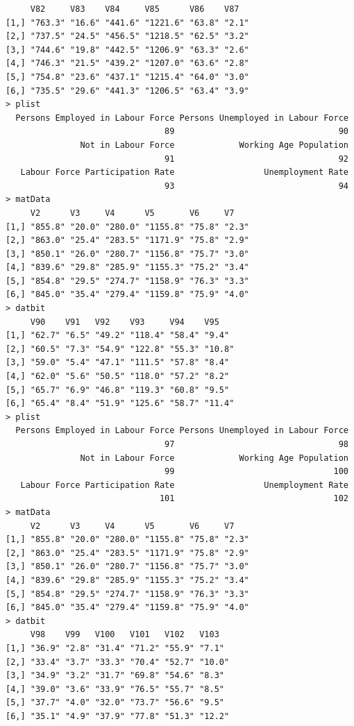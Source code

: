 \documentclass[a4paper]{article}
\begin{document}
\begin{verbatim}
     V82     V83    V84     V85      V86    V87  
[1,] "763.3" "16.6" "441.6" "1221.6" "63.8" "2.1"
[2,] "737.5" "24.5" "456.5" "1218.5" "62.5" "3.2"
[3,] "744.6" "19.8" "442.5" "1206.9" "63.3" "2.6"
[4,] "746.3" "21.5" "439.2" "1207.0" "63.6" "2.8"
[5,] "754.8" "23.6" "437.1" "1215.4" "64.0" "3.0"
[6,] "735.5" "29.6" "441.3" "1206.5" "63.4" "3.9"
> plist 
  Persons Employed in Labour Force Persons Unemployed in Labour Force 
                                89                                 90 
               Not in Labour Force             Working Age Population 
                                91                                 92 
   Labour Force Participation Rate                  Unemployment Rate 
                                93                                 94 
> matData 
     V2      V3     V4      V5       V6     V7   
[1,] "855.8" "20.0" "280.0" "1155.8" "75.8" "2.3"
[2,] "863.0" "25.4" "283.5" "1171.9" "75.8" "2.9"
[3,] "850.1" "26.0" "280.7" "1156.8" "75.7" "3.0"
[4,] "839.6" "29.8" "285.9" "1155.3" "75.2" "3.4"
[5,] "854.8" "29.5" "274.7" "1158.9" "76.3" "3.3"
[6,] "845.0" "35.4" "279.4" "1159.8" "75.9" "4.0"
> datbit 
     V90    V91   V92    V93     V94    V95   
[1,] "62.7" "6.5" "49.2" "118.4" "58.4" "9.4" 
[2,] "60.5" "7.3" "54.9" "122.8" "55.3" "10.8"
[3,] "59.0" "5.4" "47.1" "111.5" "57.8" "8.4" 
[4,] "62.0" "5.6" "50.5" "118.0" "57.2" "8.2" 
[5,] "65.7" "6.9" "46.8" "119.3" "60.8" "9.5" 
[6,] "65.4" "8.4" "51.9" "125.6" "58.7" "11.4"
> plist 
  Persons Employed in Labour Force Persons Unemployed in Labour Force 
                                97                                 98 
               Not in Labour Force             Working Age Population 
                                99                                100 
   Labour Force Participation Rate                  Unemployment Rate 
                               101                                102 
> matData 
     V2      V3     V4      V5       V6     V7   
[1,] "855.8" "20.0" "280.0" "1155.8" "75.8" "2.3"
[2,] "863.0" "25.4" "283.5" "1171.9" "75.8" "2.9"
[3,] "850.1" "26.0" "280.7" "1156.8" "75.7" "3.0"
[4,] "839.6" "29.8" "285.9" "1155.3" "75.2" "3.4"
[5,] "854.8" "29.5" "274.7" "1158.9" "76.3" "3.3"
[6,] "845.0" "35.4" "279.4" "1159.8" "75.9" "4.0"
> datbit 
     V98    V99   V100   V101   V102   V103  
[1,] "36.9" "2.8" "31.4" "71.2" "55.9" "7.1" 
[2,] "33.4" "3.7" "33.3" "70.4" "52.7" "10.0"
[3,] "34.9" "3.2" "31.7" "69.8" "54.6" "8.3" 
[4,] "39.0" "3.6" "33.9" "76.5" "55.7" "8.5" 
[5,] "37.7" "4.0" "32.0" "73.7" "56.6" "9.5" 
[6,] "35.1" "4.9" "37.9" "77.8" "51.3" "12.2"

\end{verbatim}
\end{document}
